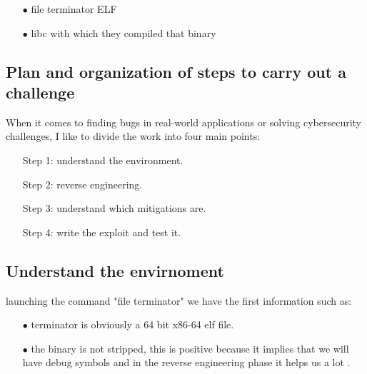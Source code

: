 \documentclass{report}
\begin{document}
    \begin{itemize}
        \item[$\bullet$] file terminator ELF  
        \item[$\bullet$] libc with which they compiled that binary
    \end{itemize}
    \clearpage
    
    \subsection{Plan and organization of steps to carry out a challenge}
    When it comes to finding bugs in real-world applications or solving cybersecurity challenges, I like to divide the work into four main points: \newline
    \begin{itemize}
        \item[Step 1:] understand the environment.
        \item[Step 2:] reverse engineering.
        \item[Step 3:] understand which mitigations are.
        \item[Step 4:] write the exploit and test it.
    \end{itemize}

    \subsection{Understand the envirnoment}
    launching the command "file terminator"  we have the first information such as:\newline
    \begin{itemize}
        \item[$\bullet$] terminator is obviously a 64 bit x86-64 elf file.
        \item[$\bullet$] the binary is not stripped, this is positive because it implies that we will have debug symbols and in the reverse engineering phase it helps us a lot .
    \end{itemize}
\end{document}
